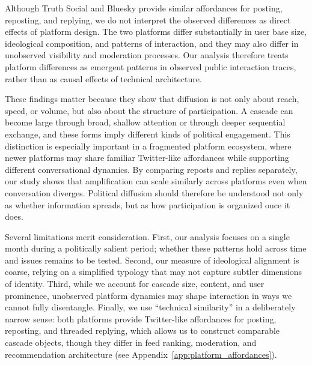 \documentclass[letterpaper]{article} %
\begin{document}
Although Truth Social and Bluesky provide similar affordances for posting, reposting, and replying, we do not interpret the observed differences as direct effects of platform design. The two platforms differ substantially in user base size, ideological composition, and patterns of interaction, and they may also differ in unobserved visibility and moderation processes. Our analysis therefore treats platform differences as emergent patterns in observed public interaction traces, rather than as causal effects of technical architecture.

These findings matter because they show that diffusion is not only about reach, speed, or volume, but also about the structure of participation. A cascade can become large through broad, shallow attention or through deeper sequential exchange, and these forms imply different kinds of political engagement. This distinction is especially important in a fragmented platform ecosystem, where newer platforms may share familiar Twitter-like affordances while supporting different conversational dynamics. By comparing reposts and replies separately, our study shows that amplification can scale similarly across platforms even when conversation diverges. Political diffusion should therefore be understood not only as whether information spreads, but as how participation is organized once it does.

Several limitations merit consideration. First, our analysis focuses on a single month during a politically salient period; whether these patterns hold across time and issues remains to be tested. Second, our measure of ideological alignment is coarse, relying on a simplified typology that may not capture subtler dimensions of identity. Third, while we account for cascade size, content, and user prominence, unobserved platform dynamics may shape interaction in ways we cannot fully disentangle. Finally, we use ``technical similarity'' in a deliberately narrow sense: both platforms provide Twitter-like affordances for posting, reposting, and threaded replying, which allows us to construct comparable cascade objects, though they differ in feed ranking, moderation, and recommendation architecture (see Appendix~\ref{app:platform_affordances}).
\end{document}
